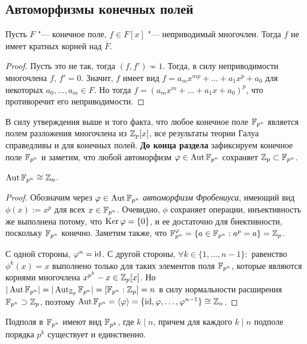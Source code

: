 \subsection{Автоморфизмы конечных полей}

\begin{proposition}
	Пусть $F$ "--- конечное поле, $f \in F[x]$ "--- неприводимый многочлен. Тогда $f$ не имеет кратных корней над $\overline{F}$.
\end{proposition}

\begin{proof}
	Пусть это не так, тогда $(f, f') \not\sim 1$. Тогда, в силу неприводимости многочлена $f$, $f' = 0$. Значит, $f$ имеет вид $f = a_mx^{mp} + \dotsc + a_1x^p + a_0$ для некоторых $a_0, \dotsc, a_m \in F$. Но тогда $f = (a_mx^{m} + \dotsc + a_1x + a_0)^p$, что противоречит его неприводимости.
\end{proof}

В силу утверждения выше и того факта, что любое конечное поле $\mathbb{F}_{p^n}$ является полем разложения многочлена из $\mathbb{Z}_p[x]$, все результаты теории Галуа справедливы и для конечных полей. \textbf{До конца раздела} зафиксируем конечное поле $\mathbb{F}_{p^n}$ и заметим, что любой автоморфизм $\varphi \in \operatorname{Aut}\mathbb{F}_{p^n}$ сохраняет $\mathbb{Z}_p \subset \mathbb{F}_{p^n}$.

\begin{theorem}
	$\operatorname{Aut}\mathbb{F}_{p^n} \cong \mathbb{Z}_n$.
\end{theorem}

\begin{proof}
	Обозначим через $\varphi \in \operatorname{Aut}\mathbb{F}_{p^n}$ \textit{автоморфизм Фробениуса}, имеющий вид $\phi(x) := x^p$ для всех $x \in \mathbb{F}_{p^n}$. Очевидно, $\phi$ сохраняет операции, инъективность же выполнена потому, что $\operatorname{Ker}\varphi = \{0\}$, и ее достаточно для биективности, поскольку $\mathbb{F}_{p^n}$ конечно. Заметим также, что $\mathbb{F}_{p^n}^{\varphi} = \{a \in \mathbb{F}_{p^n} : a^p = a\} = \mathbb{Z}_p$.
	
	С одной стороны, $\varphi^n = \operatorname{id}$. С другой стороны, $\forall k \in \{1, 
	\dotsc, n - 1\}:$ равенство $\phi^k(x) = x$ выполнено только для таких элементов поля $\mathbb{F}_{p^n}$, которые являются корнями многочлена $x^{p^k} - x \in \mathbb{Z}_p[x]$.  Но $|\operatorname{Aut}\mathbb{F}_{p^n}| = |\operatorname{Aut}_{\mathbb{Z}_p}\mathbb{F}_{p^n}| = [\mathbb{F}_{p^n} : \mathbb{Z}_p] = n$ в силу нормальности расширения $\mathbb{F}_{p^n} \supset \mathbb{Z}_p$, поэтому $\operatorname{Aut}\mathbb{F}_{p^n} = \langle\varphi\rangle = \{\operatorname{id}, \varphi, \dotsc, \varphi^{n-1}\} \cong \mathbb{Z}_n$.
\end{proof}

\begin{corollary}
	Подполя в $\mathbb{F}_{p^n}$ имеют вид $\mathbb{F}_{p^k}$, где $k \mid n$, причем для каждого $k \mid n$ подполе порядка $p^k$ существует и единственно.
\end{corollary}

